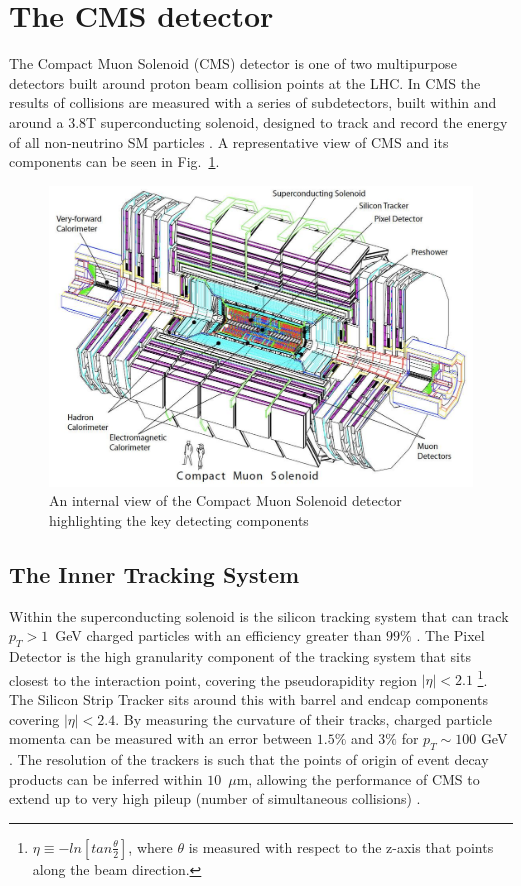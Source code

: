 \section{The CMS detector} \label{sec:cms}

The Compact Muon Solenoid (CMS) detector is one of two multipurpose
detectors built around proton beam collision points at the LHC. In CMS
the results of collisions are measured with a series of subdetectors,
built within and around a 3.8T superconducting solenoid, designed to
track and record the energy of all non-neutrino SM particles
\cite{Bayatian:2006zz}. A representative view of CMS
and its components can be seen in Fig.~\ref{fig:CMS}.  \begin{figure}
\begin{center} \includegraphics[width=0.8\linewidth]{figs/cms_detector}
\end{center} \caption{An internal view of the Compact Muon Solenoid
detector highlighting the key detecting components
\cite{Bayatian:2006zz}} \label{fig:CMS} \end{figure}

\subsection{The Inner Tracking System} Within the superconducting
solenoid is the silicon tracking system that can track
\mbox{$p_T>1$~GeV} charged particles with an efficiency greater than
$99\%$ \cite{Bayatian:2006zz}.
The Pixel Detector is the high granularity component of the tracking
system that sits closest to the interaction point, covering the
pseudorapidity region $|\eta|<2.1$ \footnote{$\eta \equiv
-ln[tan\frac{\theta}{2}]$, where $\theta$ is measured with respect to
the z-axis that points along the beam direction.}. The Silicon Strip
Tracker sits around this with barrel and endcap components covering
$|\eta|<2.4$. By measuring the curvature of their tracks, charged
particle momenta can be measured with an error between $1.5\%$ and
$3\%$ for $p_T\sim 100$ GeV \cite{Adam_Elwood_MSci}. The resolution of
the trackers is such that the points of origin of event decay products
can be inferred within $10$~$\mu$m, allowing the performance of CMS to
extend up to very high pileup (number of simultaneous collisions)
\cite{CMSTrackPerformance}.

